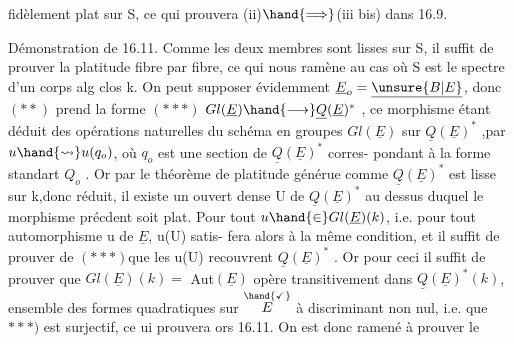 
fidèlement plat sur S, ce qui prouvera  (ii)$\hand{\Longrightarrow}$(iii bis) dans  16.9.

Démonstration de 16.11.  Comme les deux membres sont lisses sur S,
il suffit de prouver la platitude fibre par fibre, ce qui nous ramène au
cas où S est le spectre d'un corps alg clos k.  On peut  supposer
évidemment $\underline{E}_o=\underline{\unsure{B|E}}$, donc $(**)$ prend la forme
$(***)$   $Gl(\underline{E})\hand{\longrightarrow}\underline{Q}(\underline{E})^*$ ,
ce morphisme étant déduit des opérations naturelles du schéma en groupes
$Gl(\underline{E})$ sur $\underline{Q}(\underline{E})^*$ ,par $u\hand{\rightsquigarrow} u(q_o)$, où $q_o$ est une section de $\underline{Q}(\underline{E})^*$ corres-%
pondant à la forme standart $Q_o$ . Or par le théorème de platitude générue\hand{,}
comme $\underline{Q}(\underline{E})^*$ est lisse sur k,donc réduit, il existe un ouvert dense U de
$\underline{Q}(\underline{E})^*$ au dessus duquel le morphisme précdent soit plat.  Pour tout 
$u\hand{\in}Gl(\underline{E})(k)$, i.e. pour tout automorphisme u de $\underline{E}$, u(U) satis-%
fera alors à la même condition, et il suffit\hand{$\unsure{\leftarrow}$} de prouver\hand{,} \hand{$\downarrow$}
de $(***)$\hand{,}que les u(U) recouvrent $\underline{Q}(\underline{E})^*$ . Or pour ceci il suffit de prouver
que $Gl(\underline{E})(k)=$ Aut$(\underline{E})$ opère transitivement dans $\underline{Q}(\underline{E})^*(k)$, ensemble des
formes quadratiques  sur $\overset{\hand{\checkmark}}{E}$ à discriminant non nul,  i.e. que
\unsure{\deleted{(}}$***)$ est surjectif, ce ui prouvera ors 16.11.  On est donc ramené à
prouver le

